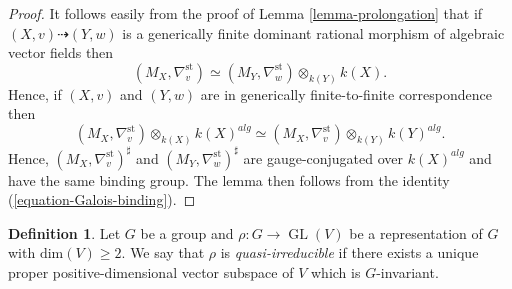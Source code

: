 \documentclass[12pt]{amsart}
\DeclareMathOperator{\GL}{GL}
\theoremstyle{definition}
\newtheorem{definition}{Definition}[subsection]
\theoremstyle{plain}
\theoremstyle{exampstyle}
\theoremstyle{exampstyle}\newtheorem{thmxbis}{Theorem}
\numberwithin{equation}{section}
\theoremstyle{remark}
\begin{document}
\begin{proof} 
It follows easily from the proof of  Lemma \ref{lemma-prolongation} that if $(X,v) \dashrightarrow (Y,w)$ is a generically finite dominant rational morphism of algebraic vector fields then 
$$ (M_X, \nabla^{\mathrm{st}}_v) \simeq  (M_Y, \nabla^{\mathrm{st}}_w) \otimes_{k(Y)} k(X).$$ 
Hence, if $(X,v)$ and $(Y,w)$ are in generically finite-to-finite correspondence then 
$$ (M_X, \nabla^{\mathrm{st}}_v) \otimes_{k(X)} k(X)^{alg} \simeq (M_X, \nabla^{\mathrm{st}}_v) \otimes_{k(Y)} k(Y)^{alg}. $$
Hence, $(M_X, \nabla^{\mathrm{st}}_v)^\sharp$ and $(M_Y, \nabla^{\mathrm{st}}_w)^\sharp$ are gauge-conjugated over $k(X)^{alg}$ and have the same binding group. The lemma then follows from the identity (\ref{equation-Galois-binding}).
\end{proof} 

\begin{definition} 
Let $G$ be a group and $\rho: G \rightarrow \GL(V)$ be a representation of $G$ with $\mathrm{dim}(V) \geq 2$. We say that $\rho$ is {\em{quasi-irreducible}} if there exists a unique proper positive-dimensional vector subspace of $V$  which is $G$-invariant. 
\end{definition} 
\end{document}
